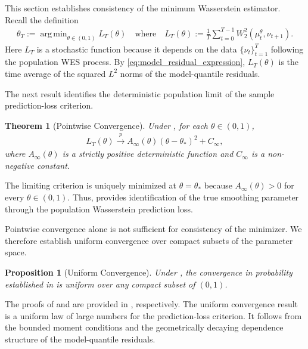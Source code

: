 \documentclass[a4paper, 11pt]{article}
\DeclareMathOperator*{\argmin}{arg\,min}
\newtheorem{theorem}{Theorem}
\newtheorem{proposition}{Proposition}
\theoremstyle{definition}
\begin{document}
This section establishes consistency of the minimum Wasserstein estimator.
Recall the definition
\begin{align}
	\theta_T := \argmin_{\theta \in (0, 1)} L_T(\theta) \quad \text{where} \quad L_T(\theta) := \frac{1}{T} \sum_{t=0}^{T-1} W_2^2( \mu_t^\theta, \nu_{t+1} ) . \label{eq:random_error}
\end{align}
Here $L_T$ is a stochastic function because it depends on the data $\{ \nu_t \}_{t=1}^{T}$ following the population WES process.
By \eqref{eq:model_residual_expression}, $L_T(\theta)$ is the time average of the squared $L^2$ norms of the model-quantile residuals.

The next result identifies the deterministic population limit of the sample prediction-loss criterion.

\begin{theorem}[Pointwise Convergence] \label{thm:pointwise_convergence}
	Under , for each $\theta \in (0, 1)$,
	\begin{align}
		L_T(\theta) \overset{p}{\to} A_\infty(\theta) (\theta - \theta_*)^2 + C_\infty ,
	\end{align}
	where $A_\infty(\theta)$ is a strictly positive deterministic function and $C_\infty$ is a non-negative constant.
\end{theorem}

The limiting criterion is uniquely minimized at $\theta=\theta_*$ because $A_\infty(\theta)>0$ for every $\theta\in(0,1)$.
Thus,  provides identification of the true smoothing parameter through the population Wasserstein prediction loss.

Pointwise convergence alone is not sufficient for consistency of the minimizer.
We therefore establish uniform convergence over compact subsets of the parameter space.

\begin{proposition}[Uniform Convergence] \label{thm:uniform_convergence}
	Under , the convergence in probability established in  is uniform over any compact subset of $(0, 1)$.
\end{proposition}

The proofs of  and  are provided in , respectively.
The uniform convergence result is a uniform law of large numbers for the prediction-loss criterion.
It follows from the bounded moment conditions and the geometrically decaying dependence structure of the model-quantile residuals.
\end{document}
